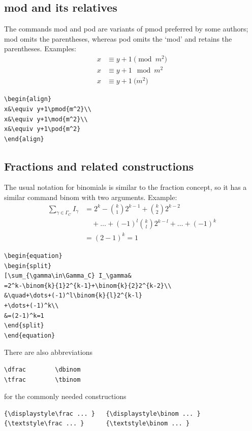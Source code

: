 \documentclass[manuscript, printscheme]{aomart}
\newcommand{\ntt}{\normalfont\ttfamily}
\newcommand{\cn}[1]{{\protect\ntt\bslash#1}}
\newtheorem[{}\it]{thm}{Theorem}[section]
\theoremstyle{definition}
\newtheorem*[{}\it]{notation}{Notation}
\begin{document}
\subsection{\cn{mod} and its relatives}
The commands \cn{mod} and \cn{pod} are variants of
\cn{pmod} preferred by some authors; \cn{mod} omits the parentheses,
whereas \cn{pod} omits the `mod' and retains the parentheses.
Examples:
\begin{align}
x&\equiv y+1\pmod{m^2}\\
x&\equiv y+1\mod{m^2}\\
x&\equiv y+1\pod{m^2}
\end{align}
\begin{verbatim}
\begin{align}
x&\equiv y+1\pmod{m^2}\\
x&\equiv y+1\mod{m^2}\\
x&\equiv y+1\pod{m^2}
\end{align}
\end{verbatim}

\subsection{Fractions and related constructions}
\label{fracs}

The usual notation for binomials is similar to the fraction concept,
so it has a similar command \cn{binom} with two arguments. Example:
\begin{equation}
\begin{split}
\sum_{\gamma\in\Gamma_C} I_\gamma&
=2^k-\binom{k}{1}2^{k-1}+\binom{k}{2}2^{k-2}\\
&\quad+\dots+(-1)^l\binom{k}{l}2^{k-l}
+\dots+(-1)^k\\
&=(2-1)^k=1
\end{split}
\end{equation}
\begin{verbatim}
\begin{equation}
\begin{split}
[\sum_{\gamma\in\Gamma_C} I_\gamma&
=2^k-\binom{k}{1}2^{k-1}+\binom{k}{2}2^{k-2}\\
&\quad+\dots+(-1)^l\binom{k}{l}2^{k-l}
+\dots+(-1)^k\\
&=(2-1)^k=1
\end{split}
\end{equation}
\end{verbatim}
There are also abbreviations
\begin{verbatim}
\dfrac        \dbinom
\tfrac        \tbinom
\end{verbatim}
for the commonly needed constructions
\begin{verbatim}
{\displaystyle\frac ... }   {\displaystyle\binom ... }
{\textstyle\frac ... }      {\textstyle\binom ... }
\end{verbatim}
\end{document}
